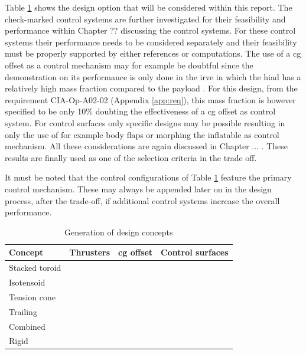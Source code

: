 Table \ref{tab:designconcepts} shows the design option that will be considered within this report. The check-marked control systems are further investigated for their feasibility and performance within Chapter ?? discussing the control systems. For these control systems their performance needs to be considered separately and their feasibility must be properly supported by either references or computations. The use of a \gls{cg} offset as a control mechanism may for example be doubtful since the demonstration on its performance is only done in the \gls{irve} in which the \gls{hiad} has a relatively high mass fraction compared to the payload \cite{Dillman2012}. For this design, from the requirement CIA-Op-A02-02 (Appendix \ref{app:req}), this mass fraction is however specified to be only 10\% doubting the effectiveness of a \gls{cg} offset as control system. For control surfaces only specific designs may be possible resulting in only the use of for example body flaps or morphing the inflatable as control mechanism. All these considerations are again discussed in Chapter ... . These results are finally used as one of the selection criteria in the trade off.

It must be noted that the control configurations of Table \ref{tab:designconcepts} feature the primary control mechanism. These may always be appended later on in the design process, after the trade-off, if additional control systems increase the overall performance. 

\begin{table}[H]
	\caption{Generation of design concepts}
	\label{tab:designconcepts}
	\centering
		\begin{tabular}{|p{}|p{}|p{}|p{}|} \hline 
			\textbf{Concept} & \textbf{Thrusters}	& \textbf{\gls{cg} offset} &  \textbf{Control surfaces} \\ \hline \hline
			Stacked toroid   & \cmark	& \cmark &  \cmark \\ \hline
			Isotensoid		 & \cmark	& \cmark &  \xmark\\ \hline
			Tension cone	 & \cmark	& \cmark &  \cmark \\ \hline
			Trailing 		 & \xmark	& \cmark &  \cmark \\ \hline
			Combined 		 & \xmark	& \cmark &  \cmark \\ \hline
			Rigid  		   	 & \cmark	& \cmark &  \cmark \\ \hline
		\end{tabular}
\end{table}

